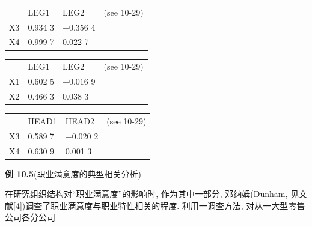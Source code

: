 \begin{mvbox}
{{\centering
{}\par}
\vspace{8pt}
{\centering
\begin{tabular}{llll}
 & LEG1 & LEG2 & (see 10-29)\\
X3 & 0.934 3 & $-0.356$ 4 &\\
X4 & 0.999 7 & 0.022 7 &
\end{tabular}\par}
\vspace{12pt}

{\centering
{}\par}
\vspace{8pt}
{\centering
\begin{tabular}{llll}
 & LEG1 & LEG2 & (see 10-29)\\
X1 & 0.602 5 & $-0.016$ 9 &\\
X2 & 0.466 3 & 0.038 3 &
\end{tabular}\par}
\vspace{12pt}

{\centering
{}\par}
\vspace{8pt}
{\centering
\begin{tabular}{llll}
 & HEAD1 & HEAD2 & (see 10-29)\\
X3 & 0.589 7 & $-0.020$ 2 &\\
X4 & 0.630 9 & 0.001 3 &
\end{tabular}\par}
\par}
\end{mvbox}

\noindent\textbf{例 10.5}\quad (职业满意度的典型相关分析)

在研究组织结构对“职业满意度”的影响时, 作为其中一部分, 邓纳姆(Dunham, 见文献[4])调查了职业满意度与职业特性相关的程度. 利用一调查方法, 对从一大型零售公司各分公司
